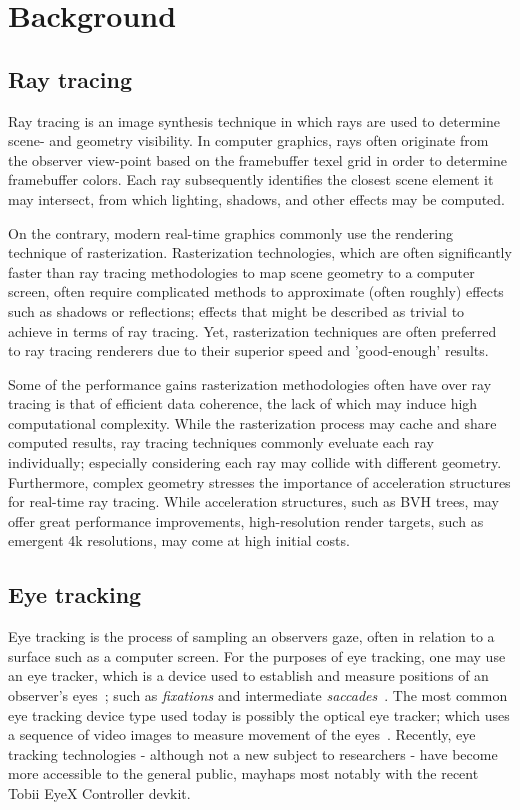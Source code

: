 \section{Background}
\subsection{Ray tracing}
Ray tracing is an image synthesis technique in which rays are used to determine scene- and geometry visibility.
In computer graphics, rays often originate from the observer view-point based on the framebuffer texel grid in order to determine framebuffer colors.
Each ray subsequently identifies the closest scene element it may intersect, from which lighting, shadows, and other effects may be computed.

On the contrary, modern real-time graphics commonly use the rendering technique of rasterization.
Rasterization technologies, which are often significantly faster than ray tracing methodologies to map scene geometry to a computer screen, often require complicated methods to approximate (often roughly) effects such as shadows or reflections; effects that might be described as trivial to achieve in terms of ray tracing.
Yet, rasterization techniques are often preferred to ray tracing renderers due to their superior speed and 'good-enough' results.

Some of the performance gains rasterization methodologies often have over ray tracing is that of efficient data coherence, the lack of which may induce high computational complexity.
While the rasterization process may cache and share computed results, ray tracing techniques commonly eveluate each ray individually; especially considering each ray may collide with different geometry.
Furthermore, complex geometry stresses the importance of acceleration structures for real-time ray tracing.
While acceleration structures, such as BVH trees, may offer great performance improvements, high-resolution render targets, such as emergent 4k resolutions, may come at high initial costs.

\subsection{Eye tracking}
Eye tracking is the process of sampling an observers gaze, often in relation to a surface such as a computer screen.
For the purposes of eye tracking, one may use an eye tracker, which is a device used to establish and measure positions of an observer's eyes~\cite{duchowski07}; such as \textit{fixations} and intermediate \textit{saccades}~\cite{rayner98}.
The most common eye tracking device type used today is possibly the optical eye tracker; which uses a sequence of video images to measure movement of the eyes~\cite{duchowski07}.
Recently, eye tracking technologies - although not a new subject to researchers - have become more accessible to the general public, mayhaps most notably with the recent Tobii EyeX Controller devkit.


